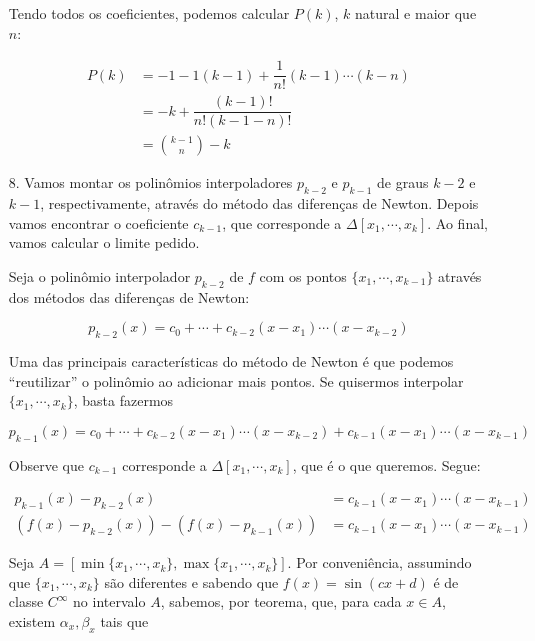 \documentclass{article}
\begin{document}
\begin{enumerate}
            Tendo todos os coeficientes, podemos calcular $P(k)$, $k$ natural e maior que $n$:

            \begin{align*}
                P(k) &= -1-1(k-1)+\dfrac{1}{n!}(k-1)\cdots(k-n) \\
                &= -k + \dfrac{(k-1)!}{n!(k-1-n)!} \\
                &= {k-1\choose n} - k
            \end{align*}

        \pagebreak

        \item[8.] Vamos montar os polinômios interpoladores $p_{k-2}$ e $p_{k-1}$ de graus
            $k-2$ e $k-1$, respectivamente, através do método das diferenças de Newton.
            Depois vamos encontrar o coeficiente $c_{k-1}$, que corresponde
            a $\Delta[x_1, \cdots, x_k]$. Ao final, vamos calcular o limite pedido.
            
            Seja o polinômio interpolador $p_{k-2}$ de $f$ com os pontos $\{x_1, \cdots, x_{k-1}\}$ através dos métodos das diferenças de Newton:
            
            $$p_{k-2}(x) = c_0 + \cdots + c_{k-2} (x - x_1)\cdots(x - x_{k-2})$$

            Uma das principais características do método de Newton é que podemos ``reutilizar'' o polinômio
            ao adicionar mais pontos. Se quisermos interpolar $\{x_1, \cdots, x_k\}$, basta fazermos
            
            $$p_{k-1}(x) = c_0 + \cdots + c_{k-2} (x - x_1)\cdots(x - x_{k-2}) + c_{k-1} (x - x_1)\cdots(x - x_{k-1})$$

            Observe que $c_{k-1}$ corresponde a $\Delta[x_1, \cdots, x_k]$, que é o que queremos. Segue:

            \begin{align}
                p_{k-1}(x) - p_{k-2}(x) &= c_{k-1} (x - x_1)\cdots(x - x_{k-1}) \nonumber \\
                (f(x) - p_{k-2}(x)) - (f(x) - p_{k-1}(x)) & = c_{k-1} (x - x_1)\cdots(x - x_{k-1}) \label{eq:first}
            \end{align}

            Seja $A = [\min\{x_1, \cdots, x_k\}, \max\{x_1, \cdots, x_k\}]$.
            Por conveniência, assumindo que $\{x_1, \cdots, x_k\}$ são diferentes
            e sabendo que $f(x) = \sin(cx + d)$ é de classe $C^\infty$ no intervalo $A$,
            sabemos, por teorema, que, para cada $x \in A$,
            existem $\alpha_x, \beta_x$
            tais que


\end{enumerate}
\end{document}
